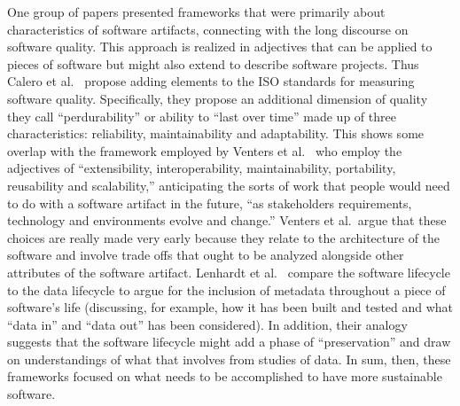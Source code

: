 \documentclass[11pt, oneside]{amsart}
\begin{document}
One group of papers presented frameworks that were primarily about
characteristics of software artifacts, connecting with the long
discourse on software quality. This approach is realized in adjectives
that can be applied to pieces of software but might also extend to
describe software projects.  Thus Calero et al.~\cite{Calero_WSSSPE} propose adding elements to the ISO
standards for measuring software quality. Specifically, they propose an additional
dimension of quality they call ``perdurability'' or ability to ``last over
time'' made up of three characteristics: reliability, maintainability
and adaptability. This shows some overlap with the framework employed
by Venters et al.~\cite{Venters_WSSSPE} who employ the adjectives of
``extensibility, interoperability, maintainability, portability,
reusability and scalability,'' anticipating the sorts of work that
people would need to do with a software artifact in the future, ``as
stakeholders requirements, technology and environments evolve and
change.'' Venters et al.~argue that these choices are really made very
early because they relate to the architecture of the software and
involve trade offs that ought to be analyzed alongside other
attributes of the software artifact. Lenhardt et
al.~\cite{Lenhardt_WSSSPE} compare the software lifecycle to the data
lifecycle to argue for the inclusion of metadata throughout a piece of
software's life (discussing, for example, how it has been built and
tested and what ``data in'' and ``data out'' has been considered). In
addition, their analogy suggests that the software lifecycle might add
a phase of ``preservation'' and draw on understandings of what that
involves from studies of data.  In sum, then, these frameworks focused
on what needs to be accomplished to have more sustainable software.
\end{document}
